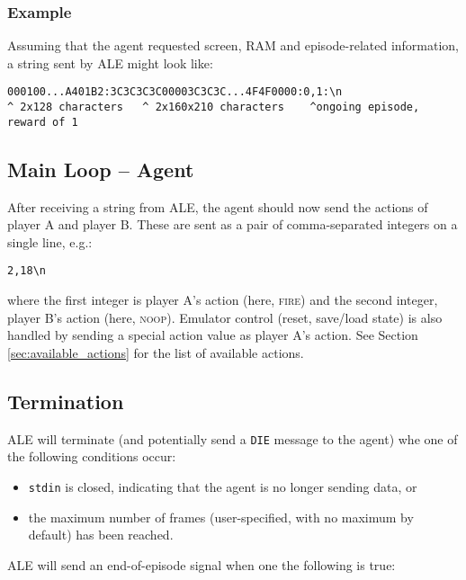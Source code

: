\documentclass[12pt]{article}
\begin{document}
\subsubsection{Example}

Assuming that the agent requested screen, RAM and episode-related information, a string sent by ALE might look like:

\begin{verbatim}
000100...A401B2:3C3C3C3C00003C3C3C...4F4F0000:0,1:\n
^ 2x128 characters   ^ 2x160x210 characters    ^ongoing episode, reward of 1
\end{verbatim}

\subsection{Main Loop -- Agent}

After receiving a string from ALE, the agent should now send the actions of player A and player B.
These are sent as a pair of comma-separated integers on a single line, e.g.:

\begin{verbatim}
2,18\n
\end{verbatim}

\noindent where the first integer is player A's action (here, \textsc{fire}) and the second integer, player B's action (here, \textsc{noop}). Emulator control (reset, save/load state) is also handled by sending a special action value as player A's action. See Section \ref{sec:available_actions} for the list of available actions.

\subsection{Termination}\label{subsec:termination_conditions}

ALE will terminate (and potentially send a \verb+DIE+ message to the agent) whe one of the following conditions occur:

\begin{itemize}
  \item{\texttt{stdin} is closed, indicating that the agent is no longer sending data, or}
  \item{the maximum number of frames (user-specified, with no maximum by default) has been reached.}
\end{itemize}

ALE will send an end-of-episode signal when one the following is true:
\end{document}
